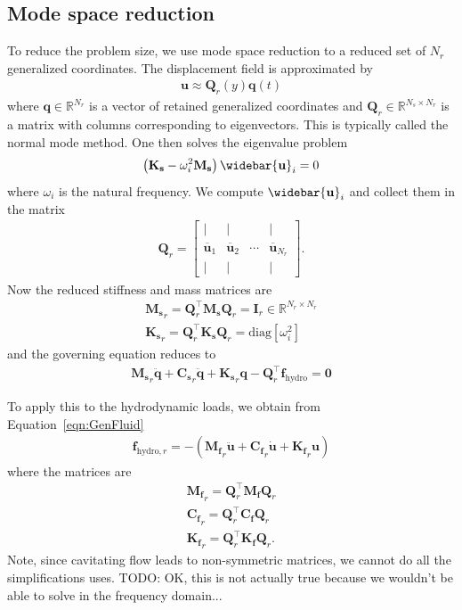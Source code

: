 \documentclass[10pt]{article}
\newcommand{\mbf}[1]{\mathbf{#1}}
\newcommand{\be}{\begin{eqnarray}}
\newcommand{\ee}{\end{eqnarray}}
\newcommand{\tn}[1]{\textrm{#1}}
\begin{document}
% 
\subsection{Mode space reduction}
%
To reduce the problem size, we use mode space reduction to a reduced set of $N_r$ generalized coordinates.
The displacement field is approximated by
%
\be
\mbf{u} \approx \mbf{Q}_r(y) \mbf{q}(t)
\ee
%
where $\mbf{q} \in \mathbb{R}^{N_r}$ is a vector of retained generalized coordinates and $\mbf{Q}_r \in \mathbb{R}^{N_s \times N_r}$ is a matrix with columns corresponding to eigenvectors.
This is typically called the normal mode method.
One then solves the eigenvalue problem
%
\be
\left( \mbf{K_s} - \omega_i^2 \mbf{M_s}
\right)
\widebar{  \mbf{u} }_i = 0
\ee
%
where $\omega_i$ is the natural frequency.
We compute $\widebar{  \mbf{u} }_i$ and collect them in the matrix
%
\be
\mbf{Q}_r=\left[\begin{array}{cccc}
        \mid                 & \mid                 &        & \mid                     \\
        \overline{\mbf{u}}_1 & \overline{\mbf{u}}_2 & \cdots & \overline{\mbf{u}}_{N_r} \\
        \mid                 & \mid                 &        & \mid
    \end{array}\right]
.
\ee
%
Now the reduced stiffness and mass matrices are
%
\be
\mbf{M_s}_r = \mbf{Q}_r^{\top} \mbf{M_s} \mbf{Q}_r = \mbf{I}_r \in \mathbb{R}^{N_r \times N_r} \\
\mbf{K_s}_r = \mbf{Q}_r^{\top} \mbf{K_s} \mbf{Q}_r = \tn{diag}\left[ \omega_i^2   \right]
\ee
%
and the governing equation reduces to
%
\be
\mbf{M_s}_r \ddot{\mbf{q}} + \mbf{C_s}_r \ddot{\mbf{q}} + \mbf{K_s}_r \mbf{q} - \mbf{Q}_r^{\top} \mbf{f}_{\tn{hydro}} = \mbf{0}
\ee
%

To apply this to the hydrodynamic loads, we obtain from Equation~\eqref{eqn:GenFluid}
%
\be
\mbf{f}_{\tn{hydro},r} =
-\left( \mbf{M_f}_r \ddot{\mbf{u}} + \mbf{C_f}_r \dot{\mbf{u}} + \mbf{K_f}_r \mbf{u}\right)
\ee
%
where the matrices are
%
\be
\mbf{M_f}_r = \mbf{Q}_r^{\top} \mbf{M_f} \mbf{Q}_r \\
\mbf{C_f}_r = \mbf{Q}_r^{\top} \mbf{C_f} \mbf{Q}_r \\
\mbf{K_f}_r = \mbf{Q}_r^{\top} \mbf{K_f} \mbf{Q}_r.
\ee
Note, since cavitating flow leads to non-symmetric matrices, we cannot do all the simplifications \citet{Jonsson2017a} uses.
TODO: OK, this is not actually true because we wouldn't be able to solve in the frequency domain...
\end{document}

